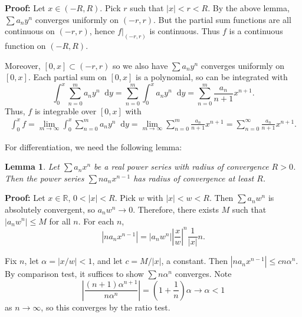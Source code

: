 \documentclass[12pt]{article}
\newcommand{\diff}{\mathop{}\!\mathrm{d}}
\newtheorem{lemma}{Lemma}[section]
\theoremstyle{definition}
\theoremstyle{remark}
\begin{document}
\begin{adjustbox}{minipage = \columnwidth - 25.5pt, margin=1em, frame=1pt, margin=0em}
	\textbf{Proof:} Let $x \in (-R, R)$. Pick $r$ such that $|x| < r < R$. By the above lemma, $\sum a_n y^{n}$ converges uniformly on $(-r, r)$. But the partial sum functions are all continuous on $(-r, r)$, hence $f|_{(-r, r)}$ is continuous. Thus $f$ is a continuous function on $(-R, R)$.

	Moreover, $[0, x] \subset (-r, r)$ so we also have $\sum a_n y^{n}$ converges uniformly on $[0, x]$. Each partial sum on $[0, x]$ is a polynomial, so can be integrated with
	\[
		\int_{0}^{x} \sum_{n = 0}^{m} a_ny^{n}\diff y = \sum_{n = 0}^{m} \int_{0}^{x} a_n y^{n}\diff y = \sum_{n = 0}^{m} \frac{a_n}{n+1}x^{n+1}
	.\]
	Thus, $f$ is integrable over $[0, x]$ with
	\begin{align*}
		\int_{0}^{x} f = \lim_{m \to \infty}\int_{0}^{x} \sum_{n = 0}^{m} a_n y^{n}\diff y = \lim_{m \to \infty} \sum_{n = 0}^{m} \frac{a_n}{n+1}x^{n+1} = \sum_{n = 0}^{\infty} \frac{a_n}{n+1}x^{n+1}.
	\end{align*}
\end{adjustbox}

For differentiation, we need the following lemma:

\begin{lemma}
	Let $\sum a_n x^{n}$ be a real power series with radius of convergence $R > 0$. Then the power series $\sum n a_n x^{n-1}$ has radius of convergence at least $R$.
\end{lemma}

\begin{adjustbox}{minipage = \columnwidth - 25.5pt, margin=1em, frame=1pt, margin=0em}
\textbf{Proof:} Let $x \in \mathbb{R}$, $0 < |x| < R$. Pick $w$ with $|x| < w < R$. Then $\sum a_n w^{n}$ is absolutely convergent, so $a_n w^{n} \to 0$. Therefore, there exists $M$ such that $|a_n w^{n}| \leq M$ for all $n$. For each $n$,
\[
|na_n x^{n-1}| = |a_n w^{n}| \left| \frac{x}{w} \right|^{n} \frac{1}{|x|}n
.\]
\end{adjustbox}

\begin{adjustbox}{minipage = \columnwidth - 25.5pt, margin=1em, frame=1pt, margin=0em}
Fix $n$, let $\alpha = |x/w| < 1$, and let $c = M/|x|$, a constant. Then $|n a_n x^{n-1}| \leq c n \alpha^{n}$. By comparison test, it suffices to show $\sum n \alpha^{n}$ converges. Note
\[
	\left| \frac{(n+1)\alpha^{n+1}}{n \alpha^{n}} \right| = \left(1 + \frac{1}{n} \right) \alpha \to \alpha < 1
\]
as $n \to \infty$, so this converges by the ratio test.

\end{adjustbox}
\end{document}
